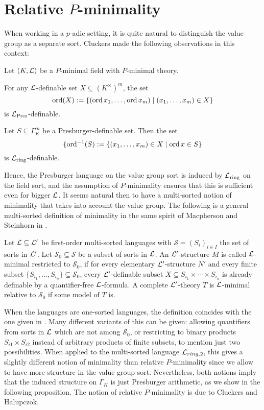 \section{Relative $P$-minimality}

When working in a $p$-adic setting, it is quite natural to distinguish the value group as a separate sort. Cluckers \cite{clu-presb03} made the following observations in this context:
\begin{thm}\label{thm:semialgpres}
Let $(K, \mathcal{L})$ be a $P$-minimal field with $P$-minimal theory. 
\item For any $\mathcal{L}$-definable set $X \subseteq (K^{\times})^m$, the set
\[\operatorname{ord}(X):=\{(\operatorname{ord} x_1, \ldots, \operatorname{ord} x_m) \mid (x_1, \ldots, x_m) \in X\}\]
is $\mathcal{L}_{\text{Pres}}$-definable.
\item Let $S \subseteq \Gamma_K^m$ be a Presburger-definable set. Then the set
\[\{\operatorname{ord}^{-1}(S):= \{ (x_1, \ldots, x_m) \in X \mid \operatorname{ord} x \in S\}\]
is $\mathcal{L}_{\text{ring}}$-definable.
\end{thm} 

Hence, the Presburger language on the value group sort is induced by $\mathcal{L}_{\text{ring}}$ on the field sort, and the assumption of $P$-minimality ensures that this is sufficient even for bigger $\mathcal{L}$. It seems natural then to have a multi-sorted notion of minimality that takes into account the value group. The following is a general multi-sorted definition of minimality in the same spirit of Macpherson and Steinhorn in \cite{macphersonETAL:96}.

\begin{defn}\label{def:relmin}
Let $\mathcal{L}\subseteq \mathcal{L}'$ be first-order multi-sorted languages with $\mathcal{S}=(S_i)_{i\in I}$ the set of sorts in $\mathcal{L}'$. Let $\mathcal{S}_0\subseteq \mathcal{S}$ be a subset of sorts in $\mathcal{L}$. An $\mathcal{L}'$-structure $M$ is called $\mathcal{L}$-minimal restricted to $\mathcal{S}_0$, if for every elementary $\mathcal{L}'$-structure $N'$ and every finite subset $\{S_{i_1},\ldots,S_{i_n}\}\subseteq \mathcal{S}_0$, every $\mathcal{L}'$-definable subset $X\subseteq S_{i_1}\times\cdots\times S_{i_n}$ is already definable by a quantifier-free $\mathcal{L}$-formula. A complete $\mathcal{L}'$-theory $T$ is $\mathcal{L}$-minimal relative to $\mathcal{S}_0$ if some model of $T$ is. 
\end{defn}

When the languages are one-sorted languages, the definition coincides with the one given in \cite{macphersonETAL:96}. Many different variants of this can be given: allowing quantifiers from sorts in $\mathcal{L}$ which are not among $\mathcal{S}_0$, or restricting to binary products $S_{i1}\times S_{i2}$ instead of arbitrary products of finite subsets, to mention just two possibilities. When applied to the multi-sorted language $\mathcal{L}_{ring,2}$, this gives a slightly different notion of minimality than relative $P$-minimality since we allow to have more structure in the value group sort. Nevertheless, both notions imply that the induced structure on $\Gamma_K$ is just Presburger arithmetic, as we show in the following proposition. The notion of relative $P$-minimality is due to Cluckers and Halupczok. 


